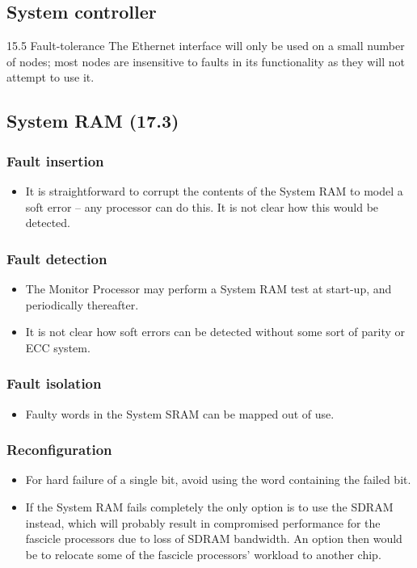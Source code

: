 \documentclass[11pt]{article}
\newenvironment{itmz}{
	\begin{itemize}
		\setlength{\itemsep}{0pt}
		\setlength{\parskip}{0pt}
	}{\end{itemize}}
\begin{document}
\subsection{System controller}
15.5 Fault-tolerance
The Ethernet interface will only be used on a small number of nodes; most nodes are insensitive to
faults in its functionality as they will not attempt to use it.

\subsection{System RAM (17.3)}
\subsubsection*{Fault insertion}
\begin{itmz}
\item It is straightforward to corrupt the contents of the System RAM to model a soft error -- any processor can do this. It is not clear how this would be detected.
\end{itmz}
\subsubsection*{Fault detection}
\begin{itmz}
\item The Monitor Processor may perform a System RAM test at start-up, and periodically thereafter.
\item It is not clear how soft errors can be detected without some sort of parity or ECC system.
\end{itmz}
\subsubsection*{Fault isolation}
\begin{itmz}
\item Faulty words in the System SRAM can be mapped out of use.
\end{itmz}
\subsubsection*{Reconfiguration}
\begin{itmz}
\item For hard failure of a single bit, avoid using the word containing the failed bit.
\item If the System RAM fails completely the only option is to use the SDRAM instead, which will
probably result in compromised performance for the fascicle processors due to loss of SDRAM
bandwidth. An option then would be to relocate some of the fascicle processors' workload to
another chip.
\end{itmz}
\end{document}
